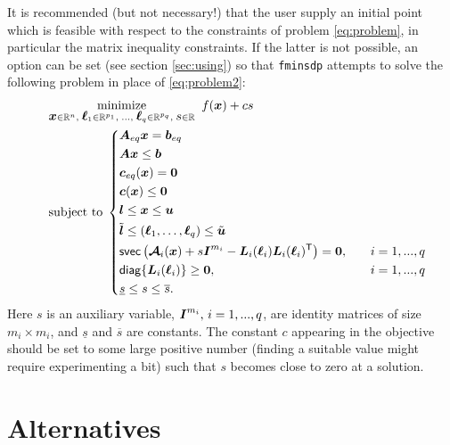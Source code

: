 \documentclass{article}
\newcommand{\bm}[1]{\mbox{\boldmath $#1$}}
\newcommand{\T}{\textsf{T}}
\newcommand{\svec}{\mbox{\textsf{svec}}}
\begin{document}
It is recommended (but not necessary!) that the user supply an initial point which is feasible with respect to the constraints of problem \eqref{eq:problem}, in particular the matrix inequality constraints. If the latter is not possible, an option can be set (see section \ref{sec:using}) so that \texttt{fminsdp} attempts to solve the following problem in place of \eqref{eq:problem2}:
\begin{equation}\label{eq:problem3}
\quad
	\begin{aligned}
	&	\underset{\bm{x}\in\mathbb{R}^{n},\; \bm{\ell}_{1}\in\mathbb{R}^{p_{1}},\;\ldots ,\;\bm{\ell}_{q}\in\mathbb{R}^{p_{q}},\;\mbox{$s$}\in\mathbb{R}}{\mbox{minimize}} \;\; f(\bm{x}) + cs \\
	&	\mbox{subject to} \;
	\left\{
		\begin{aligned}
			& \bm{A}_{eq}\bm{x} = \bm{b}_{eq} &\\
			& \bm{A}\bm{x} \leq \bm{b}	      &\\
			& \bm{c}_{eq}(\bm{x}) = \bm{0}	 	&\\
		  & \bm{c}(\bm{x}) \leq \bm{0}			&\\
			& \bm{l} \leq \bm{x} \leq \bm{u}	&\\
			& \tilde{\bm{l}} \leq (\bm{\ell}_{1},\ldots,\bm{\ell}_{q}) \leq \tilde{\bm{u}} & \\
			& \svec\left(\bm{\mathcal{A}}_{i}(\bm{x}) + s\bm{I}^{m_{i}} - \bm{L}_{i}(\bm{\ell}_{i})\bm{L}_{i}(\bm{\ell}_{i})^{\T}\right) = \bm{0}, &\quad i = 1,...,q \\
			& \mbox{\textsf{diag}}\{\bm{L}_{i}(\bm{\ell}_{i})\} \geq \bm{0}, & \quad i = 1,...,q \\
			& \underline{s} \leq s \leq \overline{s}. & 
		\end{aligned}
		\right.
	\end{aligned}
\end{equation}
Here $s$ is an auxiliary variable, $\bm{I}^{m_{i}},\, i = 1,...,q$, are identity matrices of size $m_{i} \times m_{i}$, and
$\underline{s}$ and $\overline{s}$ are constants. The constant $c$ appearing in the objective should be set to some large positive number (finding a suitable value might require experimenting a bit) such that $s$ becomes close to zero at a solution.




\section{Alternatives}
\end{document}
